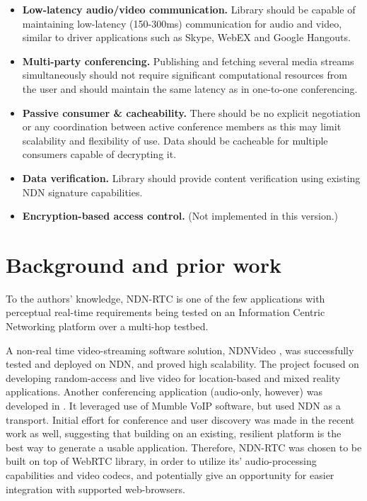 \documentclass{icn/sig-alternate-2012} %
\newcommand{\ndnrtcName}{NDN-RTC} %
\begin{document}
\begin{itemize}
\item \textbf{Low-latency audio/video communication.} Library should be capable of maintaining low-latency (150-300ms) communication for audio and video, similar to driver applications such as Skype, WebEX and Google Hangouts.

\item \textbf{Multi-party conferencing.} Publishing and fetching several media streams simultaneously should not require significant computational resources from the user and should maintain the same latency as in one-to-one conferencing.

\item \textbf{Passive consumer \& cacheability.} There should be no explicit negotiation or any coordination between active conference members as this may limit scalability and flexibility of use. Data should be cacheable for multiple consumers capable of decrypting it. 

\item \textbf{Data verification.} Library should provide content verification using existing NDN signature capabilities. 

\item \textbf{Encryption-based access control.}   (Not implemented in this version.)
\end{itemize} 


\section{Background and prior work}
\label{sec:bg}
To the authors' knowledge, \ndnrtcName{} is one of the few applications with perceptual real-time requirements being tested on an Information Centric Networking platform over a multi-hop testbed. 

A non-real time video-streaming software solution, NDNVideo \cite{ndnvideo}, was successfully tested and deployed on NDN, and proved high scalability. The project focused on developing random-access and live video for location-based and mixed reality applications. Another conferencing application (audio-only, however) was developed in \cite{act-tool}. It leveraged use of Mumble VoIP software, but used NDN as a transport. Initial effort for conference and user discovery was made in the recent work as well, suggesting that building on an existing, resilient platform is the best way to generate a usable application. Therefore, \ndnrtcName{} was chosen to be built on top of WebRTC library, in order to utilize its' audio-processing capabilities and video codecs, and potentially give an opportunity for easier integration with supported web-browsers.
\end{document}
